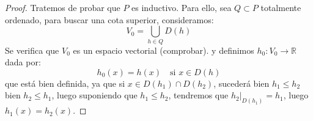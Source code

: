 \begin{teo}
\begin{proof}
        \noindent
        Tratemos de probar que $P$ es inductivo. Para ello, sea $Q\subset P$ totalmente ordenado, para buscar una cota superior, consideramos:
        \begin{equation*}
            V_0 = \bigcup_{h\in Q}D(h)
        \end{equation*}
        Se verifica que $V_0$ es un espacio vectorial (comprobar). %
        y definimos $h_0:V_0 \to \mathbb{R}$ dada por:
        \begin{equation*}
            h_0(x) = h(x) \quad \text{si\ } x\in D(h)
        \end{equation*}
        que está bien definida, ya que si $x\in D(h_1)\cap D(h_2)$, sucederá bien $h_1 \leq h_2$ bien $h_2 \leq h_1$, luego suponiendo que $h_1\leq h_2$, tendremos que $h_2\big|_{D(h_1)} = h_1$, luego $h_1(x) = h_2(x)$.


\end{proof}
\end{teo}
